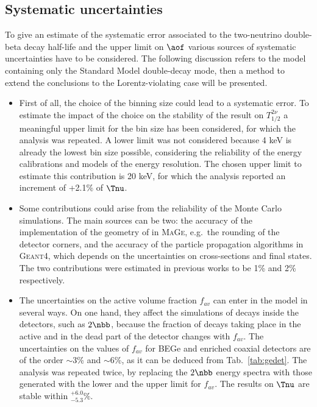 \subsection*{Systematic uncertainties}
To give an estimate of the systematic error associated to the two-neutrino double-beta decay half-life and the upper limit on $\aof$ various sources of systematic uncertainties have to be considered. The following discussion refers to the model containing only the Standard Model double-decay mode, then a method to extend the conclusions to the Lorentz-violating case will be presented.
\begin{itemize}
	\item First of all, the choice of the binning size could lead to a systematic error. To estimate the impact of the choice on the stability of the result on $T_{1/2}^{2\nu}$ a meaningful upper limit for the bin size has been considered, for which the analysis was repeated. A lower limit was not considered because 4 keV is already the lowest bin size possible, considering the reliability of the energy calibrations and models of the energy resolution. The chosen upper limit to estimate this contribution is 20 keV, for which the analysis reported an increment of +2.1\% of $\Tnu$.
	\item Some contributions could arise from the reliability of the Monte Carlo simulations. The main sources can be two: the accuracy of the implementation of the geometry of {\gerda} in \textsc{MaGe}, e.g.~the rounding of the detector corners, and the accuracy of the particle propagation algorithms in \textsc{Geant4}, which depends on the uncertainties on cross-sections and final states. The two contributions were estimated in previous works to be 1\% \cite{gerda2nbb} and 2\% \cite{geant4sys1, geant4sys2, geant4sys3} respectively.
	\item The uncertainties on the active volume fraction $f_{av}$ can enter in the model in several ways. On one hand, they affect the simulations of decays inside the detectors, such as $2\nbb$, because the fraction of decays taking place in the active and in the dead part of the detector changes with $f_{av}$. The uncertainties on the values of $f_{av}$ for BEGe and enriched coaxial detectors are of the order $\sim$3\% and $\sim$6\%, as it can be deduced from Tab.~\ref{tab:gedet}. The analysis was repeated twice, by replacing the $2\nbb$ energy spectra with those generated with the lower and the upper limit for $f_{av}$. The results on $\Tnu$ are stable within $^{+6.0}_{-5.3}\%$.


\end{itemize}
